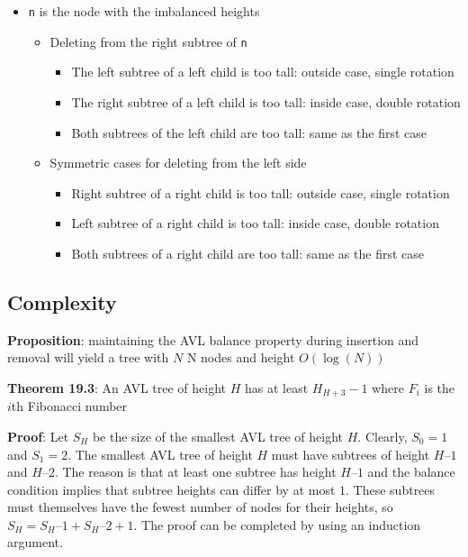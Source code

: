 \documentclass[
  10pt,
  english,
  letterpaper,
,tablecaptionabove
]{scrartcl}
\newcommand{\passthrough}[1]{#1}
\providecommand{\tightlist}{%
  \setlength{\itemsep}{0pt}\setlength{\parskip}{0pt}}
\begin{document}
\begin{itemize}
\tightlist
\item
  \passthrough{\lstinline!n!} is the node with the imbalanced heights

  \begin{itemize}
  \tightlist
  \item
    Deleting from the right subtree of \passthrough{\lstinline!n!}

    \begin{itemize}
    \tightlist
    \item
      The left subtree of a left child is too tall: outside case, single
      rotation
    \item
      The right subtree of a left child is too tall: inside case, double
      rotation
    \item
      Both subtrees of the left child are too tall: same as the first
      case
    \end{itemize}
  \item
    Symmetric cases for deleting from the left side

    \begin{itemize}
    \tightlist
    \item
      Right subtree of a right child is too tall: outside case, single
      rotation
    \item
      Left subtree of a right child is too tall: inside case, double
      rotation
    \item
      Both subtrees of a right child are too tall: same as the first
      case
    \end{itemize}
  \end{itemize}
\end{itemize}

\hypertarget{complexity}{%
\subsection{Complexity}\label{complexity}}

\textbf{Proposition}: maintaining the AVL balance property during
insertion and removal will yield a tree with \(N\) N nodes and height
\(O(\log(N))\)

\textbf{Theorem 19.3}: An AVL tree of height \(H\) has at least
\(H_{H+3} - 1\) where \(F_i\) is the \(i\)th Fibonacci number

\textbf{Proof}: Let \(S_H\) be the size of the smallest AVL tree of
height \(H\). Clearly, \(S_0 = 1\) and \(S_1 = 2\). The smallest AVL
tree of height \(H\) must have subtrees of height \(H – 1\) and
\(H – 2\). The reason is that at least one subtree has height \(H – 1\)
and the balance condition implies that subtree heights can differ by at
most \(1\). These subtrees must themselves have the fewest number of
nodes for their heights, so \(S_H = S_H – 1 + S_H – 2 + 1\). The proof
can be completed by using an induction argument.
\end{document}
